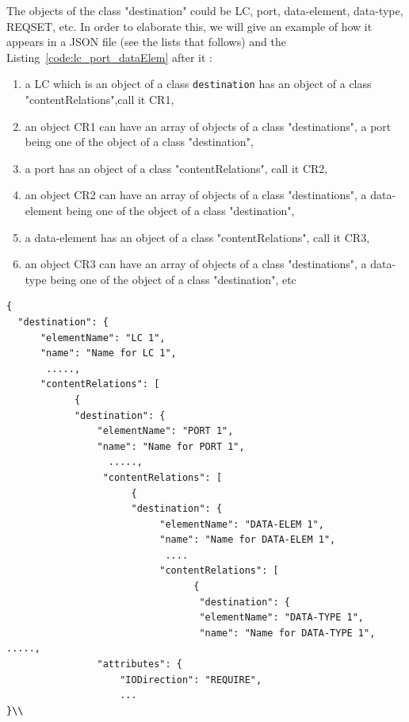 The objects of the class "destination" could be LC, port, data-element, data-type, REQSET, etc. In order to elaborate this, we will give an example of how it appears in a JSON file (see the lists that follows) and the Listing~\ref{code:lc_port_dataElem} after it : \\

\begin{enumerate}
\item a LC which is an object of a class \texttt{destination} has an object of a class "contentRelations",call it CR1,
\item an object CR1 can have an array of objects of a class "destinations", a port being one of the object of a class  "destination",
\item a port has an object of a class "contentRelations", call it CR2,
\item an object CR2 can have an array of objects of a class "destinations", a data-element being one of the object of a class "destination",
\item a data-element has an object of a class "contentRelations", call it CR3,
\item an object CR3 can have an array of objects of a class "destinations", a data-type being one of the object of a class "destination", etc \\
\end{enumerate} 

\begin{lstlisting}[caption={A sample part of a JSON file showing the relationship between a LC, a port and a data-element},label=code:lc_port_dataElem]
{
  "destination": {
      "elementName": "LC 1", 
      "name": "Name for LC 1", 
       ....., 
      "contentRelations": [
            {
            "destination": {
                "elementName": "PORT 1", 
                "name": "Name for PORT 1", 
                  ....., 
                 "contentRelations": [
                      {
                      "destination": {
                           "elementName": "DATA-ELEM 1", 
                           "name": "Name for DATA-ELEM 1", 
                            .... 
                           "contentRelations": [
                                 {
                                  "destination": {
                                  "elementName": "DATA-TYPE 1", 
                                  "name": "Name for DATA-TYPE 1",    .....,   
                "attributes": {
                    "IODirection": "REQUIRE",
                    ...
}\\
\end{lstlisting}


